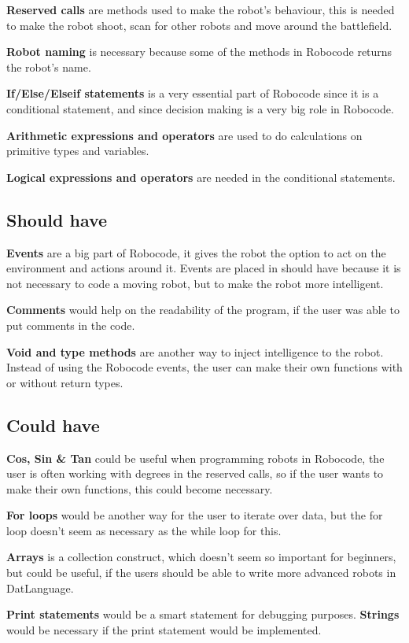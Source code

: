 \textbf{Reserved calls} are methods used to make the robot’s behaviour, this is needed to make the robot shoot, scan for other robots and move around the battlefield. 

\textbf{Robot naming} is necessary because some of the methods in Robocode returns the robot’s name. 

\textbf{If/Else/Elseif statements} is a very essential part of Robocode since it is a conditional statement, and since decision making is a very big role in Robocode.

\textbf{Arithmetic expressions and operators} are used to do calculations on primitive types and variables. 

\textbf{Logical expressions and operators} are needed in the conditional statements.

\subsection{Should have}
\textbf{Events} are a big part of Robocode, it gives the robot the option to act on the environment and actions around it. Events are placed in should have because it is not necessary to code a moving robot, but to make the robot more intelligent.

\textbf{Comments} would help on the readability of the program, if the user was able to put comments in the code. 

\textbf{Void and type methods} are another way to inject intelligence to the robot. Instead of using the Robocode events, the user can make their own functions with or without return types. 

\subsection{Could have} 
\textbf{Cos, Sin \& Tan} could be useful when programming robots in Robocode, the user is often working with degrees in the reserved calls, so if the user wants to make their own functions, this could become necessary.

\textbf{For loops} would be another way for the user to iterate over data, but the for loop doesn't seem as necessary as the while loop for this.
 
\textbf{Arrays} is a collection construct, which doesn't seem so important for beginners, but could be useful, if the users should be able to write more advanced robots in DatLanguage. 

\textbf{Print statements} would be a smart statement for debugging purposes.
\textbf{Strings} would be necessary if the print statement would be implemented.

